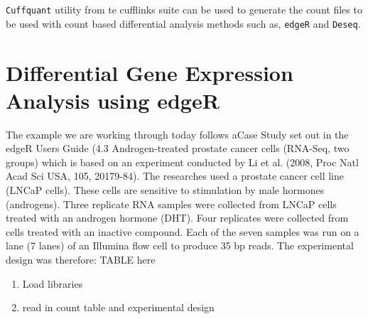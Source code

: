 \begin{information}
\texttt{Cuffquant} utility from te cufflinks suite can be used to generate the count files to be used with count based differential analysis methods such as, \texttt{edgeR} and \texttt{Deseq}.
\end{information}

\section{Differential Gene Expression Analysis using edgeR}
\begin{information}
The example we are working through today follows aCase Study set out in the edgeR Users Guide (4.3 Androgen-treated prostate cancer cells (RNA-Seq, two groups) which is based on an experiment conducted by Li et al. (2008, Proc Natl Acad Sci USA, 105, 20179-84).
The researches used a prostate cancer cell line (LNCaP cells). These cells are sensitive to stimulation by male hormones (androgens). 
Three replicate RNA samples were collected from LNCaP cells treated with an androgen hormone (DHT). Four replicates were collected from cells treated with an inactive compound. 
Each of the seven samples was run on a lane (7 lanes) of an Illumina flow cell to produce 35 bp reads.
The experimental design was therefore:
TABLE here
\end{information}
\begin{steps}
\begin{enumerate}
  \item Load libraries

  \item read in count table and experimental design
\end{enumerate}
\end{steps}


